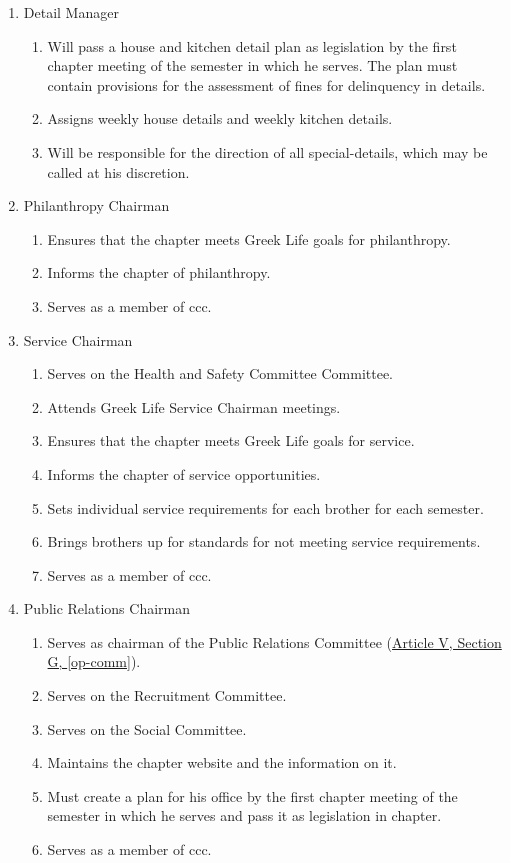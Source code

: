 \begin{enumerate}
				\item Detail Manager
					\begin{enumerate}
						\item Will pass a house and kitchen detail plan as legislation by the first chapter meeting of the semester in which he serves. The plan must contain provisions for the assessment of fines for delinquency in details.
						\item Assigns weekly house details and weekly kitchen details.
						\item Will be responsible for the direction of all \glspl{special-detail}, which may be called at his discretion.
					\end{enumerate}

				\item Philanthropy Chairman
					\begin{enumerate}
						\item Ensures that the chapter meets Greek Life goals for philanthropy.
						\item Informs the chapter of philanthropy.
						\item Serves as a member of \gls{ccc}.
					\end{enumerate}

				\item Service Chairman
					\begin{enumerate}
						\item Serves on the Health and Safety Committee Committee.
						\item Attends Greek Life Service Chairman meetings.
						\item Ensures that the chapter meets Greek Life goals for service.
						\item Informs the chapter of service opportunities.
						\item Sets individual service requirements for each brother for each semester.
						\item Brings brothers up for standards for not meeting service requirements.
						\item Serves as a member of \gls{ccc}.
					\end{enumerate}


				\item Public Relations Chairman
					\begin{enumerate}
						\item Serves as chairman of the Public Relations Committee (\hyperref[op-comm]{Article V, Section G, \autoref*{op-comm}}).
						\item Serves on the Recruitment Committee.
						\item Serves on the Social Committee.
						\item Maintains the chapter website and the information on it.
						\item Must create a plan for his office by the first chapter meeting of the semester in which he serves and pass it as legislation in chapter.
						\item Serves as a member of \gls{ccc}.
					\end{enumerate}


\end{enumerate}
